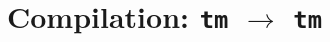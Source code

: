 \documentclass[sigconf,natbib=false]{acmart}
\begin{document}
\section[Compilation: fo\_tm to tm]{Compilation: \texttt{tm} $\to$ \texttt{tm}}

















\end{document}
